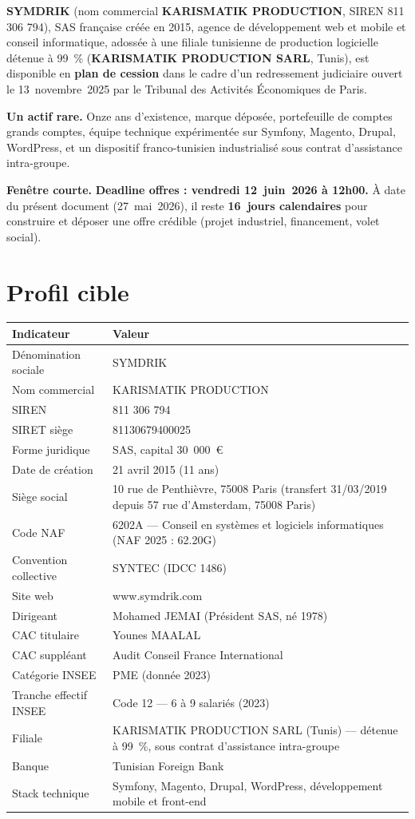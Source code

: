 \documentclass[11pt,a4paper]{article}
\begin{document}
\textbf{SYMDRIK} (nom commercial \textbf{KARISMATIK PRODUCTION}, SIREN 811 306 794), SAS française créée en 2015, agence de développement web et mobile et conseil informatique, adossée à une filiale tunisienne de production logicielle détenue à 99~\% (\textbf{KARISMATIK PRODUCTION SARL}, Tunis), est disponible en \textbf{plan de cession} dans le cadre d'un redressement judiciaire ouvert le 13~novembre~2025 par le Tribunal des Activités Économiques de Paris.

\textbf{Un actif rare.} Onze ans d'existence, marque déposée, portefeuille de comptes grands comptes, équipe technique expérimentée sur Symfony, Magento, Drupal, WordPress, et un dispositif franco-tunisien industrialisé sous contrat d'assistance intra-groupe.

\textbf{Fenêtre courte.} \textbf{Deadline offres : vendredi 12~juin~2026 à 12h00.} À date du présent document (27~mai~2026), il reste \textbf{16~jours calendaires} pour construire et déposer une offre crédible (projet industriel, financement, volet social).

\section{Profil cible}

\begin{longtable}{L{5cm}L{10cm}}
\toprule
\textbf{Indicateur} & \textbf{Valeur} \\
\midrule
\endhead
Dénomination sociale & SYMDRIK \\
Nom commercial & KARISMATIK PRODUCTION \\
SIREN & 811 306 794 \\
SIRET siège & 81130679400025 \\
Forme juridique & SAS, capital 30~000~\euro{} \\
Date de création & 21 avril 2015 (11 ans) \\
Siège social & 10 rue de Penthièvre, 75008 Paris (transfert 31/03/2019 depuis 57 rue d'Amsterdam, 75008 Paris) \\
Code NAF & 6202A --- Conseil en systèmes et logiciels informatiques (NAF 2025 : 62.20G) \\
Convention collective & SYNTEC (IDCC 1486) \\
Site web & www.symdrik.com \\
Dirigeant & Mohamed JEMAI (Président SAS, né 1978) \\
CAC titulaire & Younes MAALAL \\
CAC suppléant & Audit Conseil France International \\
Catégorie INSEE & PME (donnée 2023) \\
Tranche effectif INSEE & Code 12 --- 6 à 9 salariés (2023) \\
Filiale & KARISMATIK PRODUCTION SARL (Tunis) --- détenue à 99~\%, sous contrat d'assistance intra-groupe \\
Banque & Tunisian Foreign Bank \\
Stack technique & Symfony, Magento, Drupal, WordPress, développement mobile et front-end \\
\bottomrule
\end{longtable}
\end{document}
